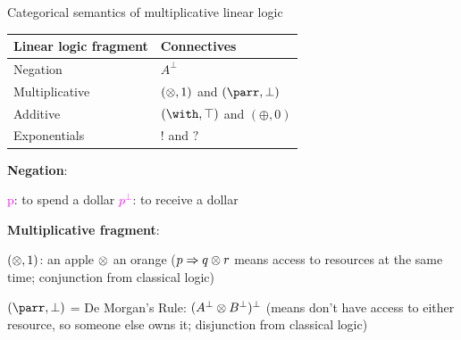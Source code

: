 \documentclass[aspectratio=169]{beamer}
\begin{document}
\begin{frame}{Categorical semantics of multiplicative linear logic}

{\small
      \begin{table}[h]
        \centering
    	\begin{tabular}{ | l | l | }
        \hline
    	 {\bf Linear logic fragment} & {\bf Connectives}  \\  
       \hline 
       \hline
      Negation & $A^\perp$ \\  
      \hline
    	\cellcolor{red!20}Multiplicative  & \cellcolor{red!20}  $(\otimes, 1)$ and $(\parr, \bot)$ \\ 
      \hline
    	Additive & $(\with, \top)$ and $(\oplus, 0)$ \\ 
      \hline
    	Exponentials & $!$ and $?$ \\ 
      \hline
    	\end{tabular}
    \end{table}


}

{\bf Negation}: 

\textcolor{magenta}{p}: to spend a dollar \qquad \qquad 
\textcolor{magenta}{$p^\perp$}: to receive a dollar 

    \vspace{0.25em}

  {\bf Multiplicative fragment}: 

    $(\otimes, 1)$: an apple $\otimes$ an orange ($p \Rightarrow q \otimes r$ means access to resources at the same time; conjunction from classical logic)

    $(\parr, \bot)$ = De Morgan's Rule: $(A^\perp \otimes B^\perp)^\perp$ (means don't have access to either resource, so someone else owns it; disjunction from classical logic)

\end{frame}
\end{document}
